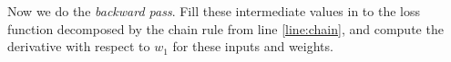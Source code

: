 \documentclass[11pt]{article}
\begin{document}
Now we do the \emph{backward pass}. Fill these intermediate values in to the loss function decomposed by the chain rule  from line \ref{line:chain}, and compute the derivative with respect to $w_1$ for these inputs and weights.



\end{document}
